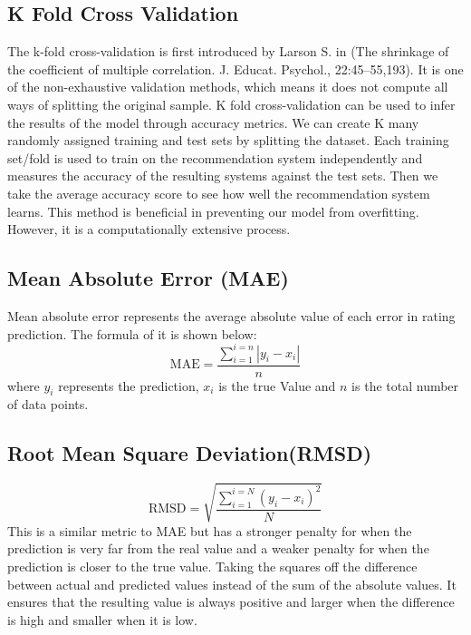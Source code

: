 \subsection{K Fold Cross Validation}
The k-fold cross-validation is first introduced by Larson S. in (The shrinkage of the coefficient of multiple correlation. J. Educat. Psychol., 22:45–55,193). It is one of the non-exhaustive validation methods, which means it does not compute all ways of splitting the original sample. 
K fold cross-validation can be used to infer the results of the model through accuracy metrics. We can create K many randomly assigned training and test sets by splitting the dataset. Each training set/fold is used to train on the recommendation system independently and measures the accuracy of the resulting systems against the test sets. Then we take the average accuracy score to see how well the recommendation system learns. This method is beneficial in preventing our model from overfitting. However, it is a computationally extensive process.

\subsection{Mean Absolute Error (MAE)}
Mean absolute error represents the average absolute value of each error in rating prediction. The formula of it is shown below:
\begin{equation*}
\text{MAE} = \frac{\sum^{i=n}_{i=1}|y_{i} - x_{i}|}{n}
\end{equation*}
where $y_{i} $ represents the prediction, $x_{i} $ is the true Value and $n$ is the total number of data points. 

\subsection{Root Mean Square Deviation(RMSD)}
\begin{equation*}
\text{RMSD} = \sqrt{\frac{\sum^{i=N}_{i=1}(y_{i} - x_{i})^{2}}{N}}
\end{equation*}
This is a similar metric to MAE but has a stronger penalty for when the prediction is very far from the real value and a weaker penalty for when the prediction is closer to the true value. Taking the squares off the difference between actual and predicted values instead of the sum of the absolute values. It ensures that the resulting value is always positive and larger when the difference is high and smaller when it is low.



